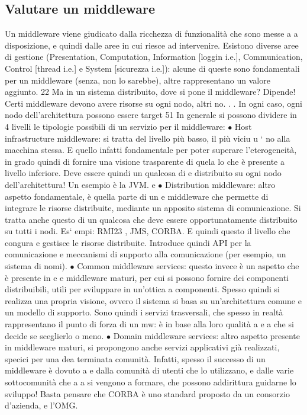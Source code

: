 \subsection{Valutare un middleware}
Un middleware viene giudicato dalla ricchezza di funzionalità che sono messe a
a
disposizione, e quindi dalle aree in cui riesce ad intervenire. Esistono diverse
aree di gestione (Presentation, Computation, Information [loggin i.e.], Communication, Control [thread i.e.] e System
[sicurezza i.e.]): alcune di queste sono
fondamentali per un middleware (senza, non lo sarebbe), altre rappresentano
un valore aggiunto.
22 Ma in un sistema distribuito, dove si pone il middleware? Dipende! Certi middleware
devono avere risorse su ogni nodo, altri no. . . In ogni caso, ogni nodo dell'architettura possono
essere target
51
In generale si possono dividere in 4 livelli le tipologie possibili di un servizio
per il middleware:
$\bullet$ Host infrastructure middleware: si tratta del livello più basso, il più viciu
u
`
no alla macchina stessa. E quello infatti fondamentale per poter superare
l'eterogeneità, in grado quindi di fornire una visione trasparente di quela
lo che è presente a livello inferiore. Deve essere quindi un qualcosa di
e
distribuito su ogni nodo dell'architettura! Un esempio è la JVM.
e
$\bullet$ Distribution middleware: altro aspetto fondamentale, è quella parte di un
e
middleware che permette di integrare le risorse distribuite, mediante un
apposito sistema di comunicazione. Si tratta anche questo di un qualcosa che deve essere opportunatamente distribuito su
tutti i nodi. Es`
empi: RMI23 , JMS, CORBA. E quindi questo il livello che congura e
gestisce le risorse distribuite. Introduce quindi API per la comunicazione
e meccanismi di supporto alla comunicazione (per esempio, un sistema di
nomi).
$\bullet$ Common middleware services: questo invece è un aspetto che è presente in
e
e
middleware maturi, per cui si possono fornire dei componenti distribuibili,
utili per sviluppare in un'ottica a componenti. Spesso quindi si realizza
una propria visione, ovvero il sistema si basa su un'architettura comune
e un modello di supporto. Sono quindi i servizi trasversali, che spesso in
realtà rappresentano il punto di forza di un mw: è in base alla loro qualità
a
e
a
che si decide se sceglierlo o meno.
$\bullet$ Domain middleware services: altro aspetto presente in middleware maturi,
si propongono anche servizi applicativi già realizzati, specici per una dea
terminata comunità. Infatti, spesso il successo di un middleware è dovuto
a
e
dalla comunità di utenti che lo utilizzano, e dalle varie sottocomunità che
a
a
si vengono a formare, che possono addirittura guidarne lo sviluppo! Basta
pensare che CORBA è uno standard proposto da un consorzio d'azienda,
e
l'OMG.
